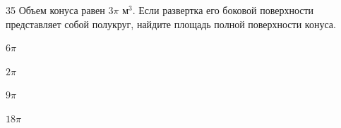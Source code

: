 \documentclass[14pt]{article}
\begin{document}
\begin{questionbox}{35}
    Объем конуса равен \(3\pi\) м\(^3\). Если развертка его боковой поверхности представляет собой полукруг, найдите площадь полной поверхности конуса.
    \begin{options}
        \item \(6\pi\)
        \item \(2\pi\)
        \item \(9\pi\)
        \item \(18\pi\)
    \end{options}
\end{questionbox}
\end{document}
